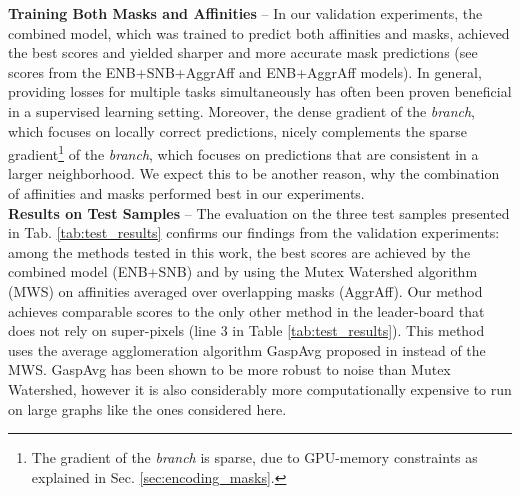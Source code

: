 \textbf{Training Both Masks and Affinities} -- In our validation experiments, the combined model, which was trained to predict both affinities and \maskname masks, achieved the best scores and yielded sharper and more accurate mask predictions (see scores from the ENB+SNB+AggrAff and ENB+AggrAff models).
In general, providing losses for multiple tasks simultaneously has often been proven beneficial in a supervised learning setting.
Moreover, the dense gradient of the \emph{\encBr branch}, which focuses on locally correct predictions, nicely complements the sparse gradient\footnote{The gradient of the \emph{\encBr branch} is sparse, due to GPU-memory constraints as explained in Sec. \ref{sec:encoding_masks}.} of the \emph{\encBr branch}, which focuses on predictions that are consistent in a larger neighborhood. We expect this to be another reason, why the combination of affinities and \maskname masks performed best in our experiments. \\





\textbf{Results on Test Samples} -- The evaluation on the three test samples presented in Tab. \ref{tab:test_results} confirms our findings from the validation experiments: among the methods tested in this work, the best scores are achieved by the combined model (ENB+SNB) and by using the Mutex Watershed algorithm (MWS) on affinities averaged over overlapping masks (AggrAff).
Our method achieves comparable scores to the only other method in the leader-board that does not rely on super-pixels (line 3 in Table \ref{tab:test_results}). This method uses the average agglomeration algorithm GaspAvg proposed in \cite{bailoni2019generalized} instead of the MWS. GaspAvg has been shown to be more robust to noise than Mutex Watershed, however it is also considerably more computationally expensive to run on large graphs like the ones considered here. 

